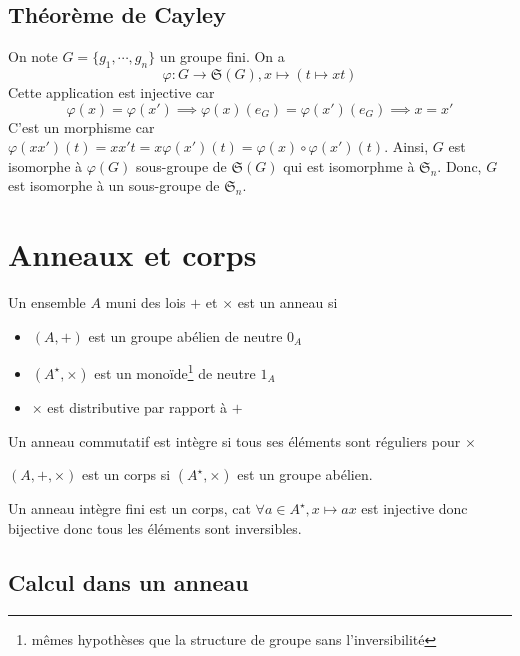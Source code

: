 \subsection{Théorème de Cayley}

On note $G=\{g_1, \cdots, g_n\}$ un groupe fini. On a \[
    \varphi: G\to \mathfrak S(G), x\longmapsto (t\longmapsto xt)
\]
Cette application est injective car \[
    \varphi(x)=\varphi(x')\implies \varphi(x)(e_G)=\varphi(x')(e_G)\implies x=x'
\]
C'est un morphisme car $\varphi(xx')(t)=xx't=x\varphi(x')(t)=\varphi(x)\circ \varphi(x')(t)$.
Ainsi, $G$ est isomorphe à $\varphi(G)$ sous-groupe de $\mathfrak S(G)$ qui est isomorphme à $\mathfrak S_n$. Donc, $G$ est isomorphe à un sous-groupe de $\mathfrak S_n$.

\section{Anneaux et corps}

\begin{dfn}
     Un ensemble $A$ muni des lois $+$ et $\times$ est un anneau si \begin{itemize}
        \item $(A, +)$ est un groupe abélien de neutre $0_A$
        \item $(A^\star, \times)$ est un monoïde\footnote{mêmes hypothèses que la structure de groupe sans l'inversibilité} de neutre $1_A$
        \item $\times$ est distributive par rapport à $+$
    \end{itemize}
\end{dfn}

\begin{dfn}
    Un anneau commutatif est intègre si tous ses éléments sont réguliers pour $\times$
\end{dfn}

\begin{dfn}
    $(A, +, \times)$ est un corps si $(A^\star, \times)$ est un groupe abélien.
\end{dfn}

\begin{rem}
    Un anneau intègre fini est un corps, cat $\forall a\in A^\star, x\longmapsto ax$ est injective donc bijective donc tous les éléments sont inversibles.
\end{rem}

\subsection{Calcul dans un anneau}


